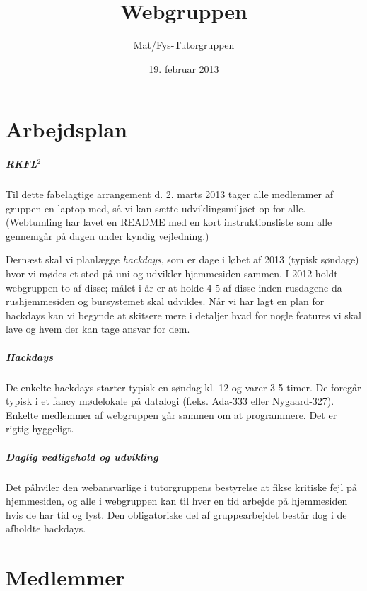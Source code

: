 \documentclass[article,oneside,a4paper]{memoir}
\begin{document}
\title{Webgruppen}
\author{Mat/Fys-Tutorgruppen}
\date{19. februar 2013}
\maketitle

\chapter{Arbejdsplan}

\paragraph{RKFL$^2$}
Til dette fabelagtige arrangement d. 2. marts 2013 tager alle medlemmer af
gruppen en laptop med, så vi kan sætte udviklingsmiljøet op for alle.
(Webtumling har lavet en {\small README} med en kort instruktionsliste som alle
gennemgår på dagen under kyndig vejledning.)

Dernæst skal vi planlægge \emph{hackdays}, som er dage i løbet af 2013 (typisk
søndage) hvor vi mødes et sted på uni og udvikler hjemmesiden sammen.
I 2012 holdt webgruppen to af disse; målet i år er at holde 4-5 af disse inden
rusdagene da rushjemmesiden og bursystemet skal udvikles.
Når vi har lagt en plan for hackdays kan vi begynde at skitsere mere i detaljer
hvad for nogle features vi skal lave og hvem der kan tage ansvar for dem.

\paragraph{Hackdays}
De enkelte hackdays starter typisk en søndag kl. 12 og varer 3-5 timer.
De foregår typisk i et fancy mødelokale på datalogi (f.eks. Ada-333 eller Nygaard-327).
Enkelte medlemmer af webgruppen går sammen om at programmere. Det er rigtig hyggeligt.

\paragraph{Daglig vedligehold og udvikling}
Det påhviler den webansvarlige i tutorgruppens bestyrelse at fikse kritiske fejl på hjemmesiden,
og alle i webgruppen kan til hver en tid arbejde på hjemmesiden hvis de har tid og lyst.
Den obligatoriske del af gruppearbejdet består dog i de afholdte hackdays.

\chapter{Medlemmer}
\end{document}
